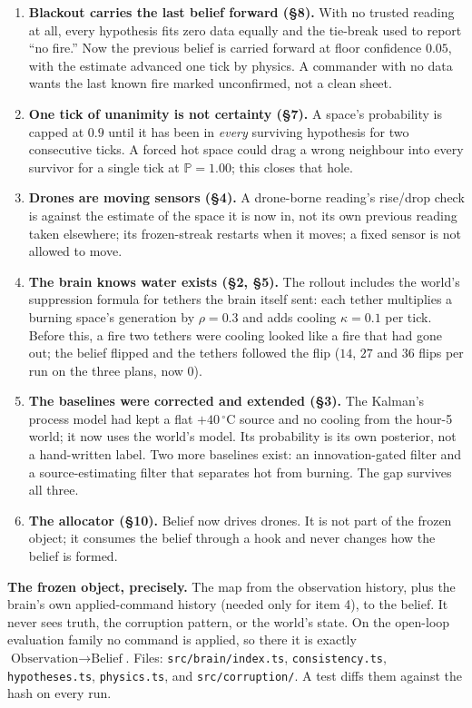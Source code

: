 \documentclass[11pt]{article}
\newcommand{\degC}{^\circ\mathrm{C}}
\begin{document}
\begin{keybox}
\begin{enumerate}[leftmargin=1.4em,itemsep=4pt]
  \item \textbf{Blackout carries the last belief forward (\S8).} With no trusted reading at all, every hypothesis fits zero data equally and the tie-break used to report ``no fire.'' Now the previous belief is carried forward at floor confidence $0.05$, with the estimate advanced one tick by physics. A commander with no data wants the last known fire marked unconfirmed, not a clean sheet.
  \item \textbf{One tick of unanimity is not certainty (\S7).} A space's probability is capped at $0.9$ until it has been in \emph{every} surviving hypothesis for two consecutive ticks. A forced hot space could drag a wrong neighbour into every survivor for a single tick at $\mathbb{P}=1.00$; this closes that hole.
  \item \textbf{Drones are moving sensors (\S4).} A drone-borne reading's rise/drop check is against the estimate of the space it is now in, not its own previous reading taken elsewhere; its frozen-streak restarts when it moves; a fixed sensor is not allowed to move.
  \item \textbf{The brain knows water exists (\S2, \S5).} The rollout includes the world's suppression formula for tethers the brain itself sent: each tether multiplies a burning space's generation by $\rho = 0.3$ and adds cooling $\kappa = 0.1$ per tick. Before this, a fire two tethers were cooling looked like a fire that had gone out; the belief flipped and the tethers followed the flip ($14$, $27$ and $36$ flips per run on the three plans, now $0$).
  \item \textbf{The baselines were corrected and extended (\S3).} The Kalman's process model had kept a flat $+40\,\degC$ source and no cooling from the hour-5 world; it now uses the world's model. Its probability is its own posterior, not a hand-written label. Two more baselines exist: an innovation-gated filter and a source-estimating filter that separates hot from burning. The gap survives all three.
  \item \textbf{The allocator (\S10).} Belief now drives drones. It is not part of the frozen object; it consumes the belief through a hook and never changes how the belief is formed.
\end{enumerate}
\end{keybox}

\medskip
\noindent
\textbf{The frozen object, precisely.} The map from the observation history, plus the brain's own applied-command history (needed only for item 4), to the belief. It never sees truth, the corruption pattern, or the world's state. On the open-loop evaluation family no command is applied, so there it is exactly $\text{Observation} \to \text{Belief}$. Files: \texttt{src/brain/index.ts}, \texttt{consistency.ts}, \texttt{hypotheses.ts}, \texttt{physics.ts}, and \texttt{src/corruption/}. A test diffs them against the hash on every run.
\end{document}
